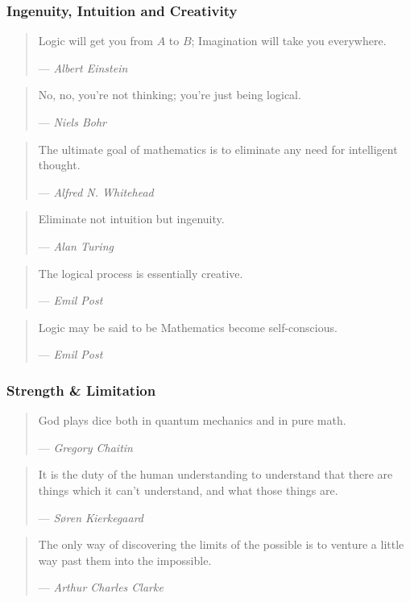 \documentclass[UTF8,11pt,colorlinks,compress,openany]{beamer}%
\begin{document}
\begin{frame}\frametitle{Ingenuity, Intuition and Creativity}
	\begin{quote}
		Logic will get you from $A$ to $B$; Imagination will take you everywhere. \par
		\hfill --- \textsl{Albert Einstein}
	\end{quote}
	\begin{quote}
		No, no, you're not thinking; you're just being logical. \par
		\hfill --- \textsl{Niels Bohr}
	\end{quote}
	\begin{quote}
		The ultimate goal of mathematics is to eliminate any need for intelligent thought.\par
		\hfill --- \textsl{Alfred N. Whitehead}
	\end{quote}
	\begin{quote}
		Eliminate not intuition but ingenuity.\par
		\hfill --- \textsl{Alan Turing}
	\end{quote}
	\begin{quote}
		The logical process is essentially creative.\par
		\hfill --- \textsl{Emil Post}
	\end{quote}
	\begin{quote}
		Logic may be said to be Mathematics become
		self-conscious.\par
		\hfill --- \textsl{Emil Post}
	\end{quote}
\end{frame}

\begin{frame}\frametitle{Strength \& Limitation}
	\begin{quote}
		God plays dice both in quantum mechanics and in pure math. \par
		\hfill --- \textsl{Gregory Chaitin}
	\end{quote}
	\begin{quote}
		It is the duty of the human understanding to understand that there are things which it can't understand, and what those things are.\par
		\hfill --- \textsl{S{\o}ren Kierkegaard}
	\end{quote}
	\begin{quote}
		The only way of discovering the limits of the possible is to venture a little way past them into the impossible. \par
		\hfill --- \textsl{Arthur Charles Clarke}
	\end{quote}
\end{frame}
\end{document}

